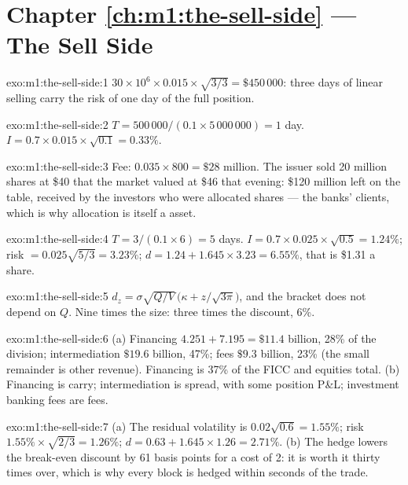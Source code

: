 \section*{Chapter \ref{ch:m1:the-sell-side} --- The Sell Side}

\begin{solution}{exo:m1:the-sell-side:1}
$30 \times 10^6 \times 0.015 \times \sqrt{3/3} = \$450\,000$: three days of
linear selling carry the risk of one day of the full position.
\end{solution}

\begin{solution}{exo:m1:the-sell-side:2}
$T = 500\,000/(0.1 \times 5\,000\,000) = 1$ day. $I = 0.7 \times 0.015 \times
\sqrt{0.1} = 0.33\%$.
\end{solution}

\begin{solution}{exo:m1:the-sell-side:3}
Fee: $0.035 \times 800 = \$28$ million. The issuer sold 20 million shares at
\$40 that the market valued at \$46 that evening: \$120 million left on the
table, received by the investors who were allocated shares --- the banks'
clients, which is why allocation is itself a  asset.
\end{solution}

\begin{solution}{exo:m1:the-sell-side:4}
$T = 3/(0.1\times 6) = 5$ days. $I = 0.7 \times 0.025 \times \sqrt{0.5} =
1.24\%$; risk $= 0.025\sqrt{5/3} = 3.23\%$; $d = 1.24 + 1.645 \times 3.23 =
6.55\%$, that is \$1.31 a share.
\end{solution}

\begin{solution}{exo:m1:the-sell-side:5}
$d_z = \sigma\sqrt{Q/V}\,\bigl(\kappa + z/\sqrt{3\pi}\bigr)$, and the bracket
does not depend on $Q$. Nine times the size: three times the discount, 6\%.
\end{solution}

\begin{solution}{exo:m1:the-sell-side:6}
(a) Financing $4.251 + 7.195 = \$11.4$ billion, 28\% of the division;
intermediation $\$19.6$ billion, 47\%; fees $\$9.3$ billion, 23\% (the small
remainder is other revenue). Financing is 37\% of the FICC and equities
total. (b) Financing is carry; intermediation is spread, with some position
P\&L; investment banking fees are fees.
\end{solution}

\begin{solution}{exo:m1:the-sell-side:7}
(a) The residual volatility is $0.02\sqrt{0.6} = 1.55\%$; risk
$1.55\% \times \sqrt{2/3} = 1.26\%$; $d = 0.63 + 1.645 \times 1.26 =
2.71\%$. (b) The hedge lowers the break-even discount by 61 basis points for
a cost of 2: it is worth it thirty times over, which is why every block is
hedged within seconds of the trade.
\end{solution}

